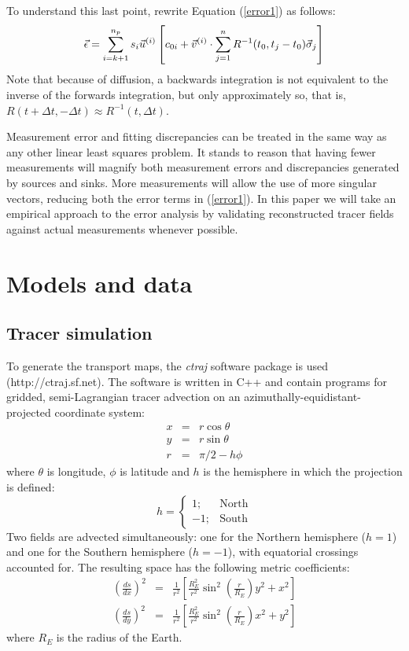 To understand this last point, rewrite Equation (\ref{error1}) as follows:
\begin{equation}
	\vec \epsilon = \sum_{i=k+1}^{n_p} s_i \vec u^{(i)} \left [c_{0i}
	+ \vec v^{(i)} \cdot \sum_{j=1}^n R^{-1}(t_0, t_j-t_0) \vec \sigma_j \right ]
\end{equation}
Note that because of diffusion, 
a backwards integration is not equivalent to the inverse of the
forwards integration, but only approximately so, that is,
$R(t+\Delta t, -\Delta t) \approx R^{-1}(t, \Delta t)$.

Measurement error and fitting discrepancies can be treated in the same way 
as any other linear least squares problem. 
It stands to reason that having fewer measurements will magnify both
measurement errors and discrepancies generated by sources and sinks.
More measurements will allow the use of more singular vectors,
reducing both the error terms in (\ref{error1}).
In this paper we will take an empirical approach to the error analysis by
validating reconstructed tracer fields against actual measurements whenever
possible.

\section{Models and data}

\subsection{Tracer simulation}

To generate the transport maps, the \textit{ctraj} software package is used (http://ctraj.sf.net).  
The software is written in C++ and contain programs
for gridded, semi-Lagrangian tracer advection on an 
azimuthally-equidistant-projected coordinate system:
\begin{eqnarray}
  x & = & r \cos \theta \\
  y & = & r \sin \theta \\
  r & = & \pi/2 - h \phi
\end{eqnarray}
where $\theta$ is longitude, $\phi$ is latitude
and $h$ is the hemisphere in which the projection is
defined:
\begin{equation}
h = \left \lbrace \begin{array}{rl} 1; & \mathrm{North} \\ -1; & \mathrm{South} \end{array} \right .
\end{equation}
Two fields are advected simultaneously: one for the Northern hemisphere ($h=1$)
and one for the Southern hemisphere ($h=-1$), with equatorial crossings accounted for.
The resulting space has the following metric coefficients:
\begin{eqnarray}
\left (\frac{ds}{d x} \right )^2 & = & \frac{1}{r^2} \left [
	\frac{R_E^2}{r^2} \sin^2 \left (\frac{r}{R_E} \right ) 
	y^2 + x^2 \right ] \\ \nonumber
\left (\frac{ds}{d y} \right )^2 & = & \frac{1}{r^2} \left [
	\frac{R_E^2}{r^2} \sin^2 \left (\frac{r}{R_E} \right )
	x^2 + y^2 \right ]
	\label{metric_coef}
\end{eqnarray}
where $R_E$ is the radius of the Earth.

